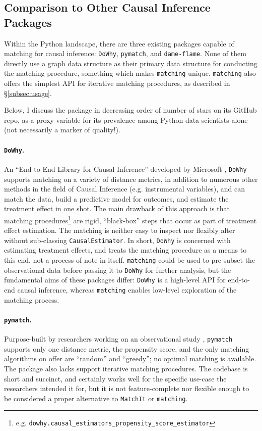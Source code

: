\documentclass[11pt]{extarticle}
\begin{document}
\subsection{Comparison to Other Causal Inference Packages}

Within the Python landscape, there are three existing packages capable of matching for causal inference: \texttt{DoWhy}, \texttt{pymatch}, and \texttt{dame-flame}.
None of them directly use a graph data structure as their primary data structure for conducting the matching procedure, something which makes \texttt{matching} unique. \texttt{matching} also offers the simplest API for iterative matching procedures, as described in \S\ref{subsec:usage}.

Below, I discuss the package in decreasing order of number of stars on its GitHub repo, as a proxy variable for its prevalence among Python data scientists alone (not necessarily a marker of quality!).

\paragraph{\texttt{DoWhy}.} An ``End-to-End Library for Causal Inference'' developed by Microsoft \parencite{dowhypaper}, \texttt{DoWhy} supports matching on a variety of distance metrics, in addition to numerous other methods in the field of Causal Inference (e.g. instrumental variables), and can match the data, build a predictive model for outcomes, and estimate the treatment effect in one shot.
The main drawback of this approach is that matching procedures\footnote{e.g. \texttt{dowhy.causal\_estimators\_propensity\_score\_estimator}} are rigid, ``black-box'' steps that occur as part of treatment effect estimation.
The matching is neither easy to inspect nor flexibly alter without sub-classing \texttt{CausalEstimator}. In short, \texttt{DoWhy} is concerned with estimating treatment effects, and treats the matching procedure as a means to this end, not a process of note in itself. \texttt{matching} could be used to pre-subset the observational data before passing it to \texttt{DoWhy} for further analysis, but the fundamental aims of these packages differ: \texttt{DoWhy} is a high-level API for end-to-end causal inference, whereas \texttt{matching} enables low-level exploration of the matching process.

\paragraph{\texttt{pymatch}.} Purpose-built by researchers working on an observational study \parencite{miroglio_pymatch_2022}, \texttt{pymatch} supports only one distance metric, the propensity score, and the only matching algorithms on offer are ``random'' and ``greedy''; no optimal matching is available. 
The package also lacks support iterative matching procedures.
The codebase is short and succinct, and certainly works well for the specific use-case the researchers intended it for, but it is not feature-complete nor flexible enough to be considered a proper alternative to \texttt{MatchIt} or \texttt{matching}.
\end{document}

